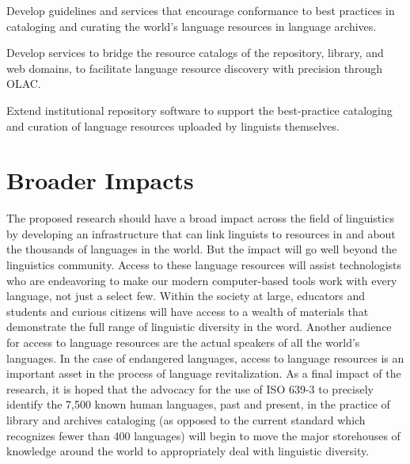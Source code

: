 \documentclass[11pt]{nsf}
\begin{document}
\begin{description}\setlength{\itemsep}{0pt}\setlength{\parskip}{0pt}
  \item[Access to Language Resources in Archives:]
    Develop guidelines and services that encourage conformance to best
    practices in cataloging and curating the world's language resources
    in language archives.

  \item[Access to Language Resources on the Web:]
    Develop services to bridge the resource catalogs of the
    repository, library, and web domains,
    to facilitate language resource discovery with precision through OLAC.

  \item[Access to Language Resources from the Field:]
    Extend institutional repository software to support the
    best-practice cataloging and curation of language resources
    uploaded by linguists themselves.
\end{description}

\section*{Broader Impacts}

The proposed research should have a broad impact across the field of
linguistics by developing an infrastructure that can link linguists to
resources in and about the thousands of languages in the world. But the
impact will go well beyond the linguistics community. Access to these
language resources will assist technologists who are endeavoring to make
our modern computer-based tools work with every language, not just a select
few.  Within the society at large, educators and students and curious
citizens will have access to a wealth of materials that demonstrate the
full range of linguistic diversity in the word. Another audience for access
to language resources are the actual speakers of all the world's languages.
In the case of endangered languages, access to language resources is an
important asset in the process of language revitalization. As a final
impact of the research, it is hoped that the advocacy for the use of ISO
639-3 to precisely identify the 7,500 known human languages, past and
present, in the practice of library and archives cataloging (as opposed to
the current standard which recognizes fewer than 400 languages) will begin
to move the major storehouses of knowledge around the world to
appropriately deal with linguistic diversity.
\end{document}
